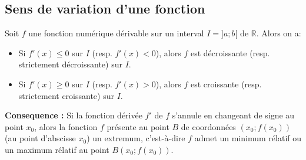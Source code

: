 \documentclass[a4paper, 12pt]{report}
\begin{document}
            \subsection{Sens de variation d'une fonction}
                Soit $f$ une fonction numérique dérivable sur un interval $I=]a;b[$ de $\mathbb{R}$. Alors on a: 
                \begin{itemize}
                    \item Si $f'(x)\leq 0$ sur $I$ (resp. $f'(x)<0$), alors $f$ est décroissante (resp. strictement décroissante) sur $I$.
                    \item Si $f'(x)\geq 0$ sur $I$ (resp. $f'(x)>0$), alors $f$ est croissante (resp. strictement croissante) sur $I$.
                \end{itemize}
                \textbf{Consequence : } Si la fonction dérivée $f'$ de $f$ s'annule en changeant de signe au point $x_0$, alors la fonction $f$ 
                présente au point $B$ de coordonnées $(x_0;f(x_0))$ (au point d'abscisse $x_0$) un extremum, c'est-à-dire $f$ admet un minimum
                rélatif ou un maximum rélatif au point $B(x_0;f(x_0))$.
            
\end{document}

